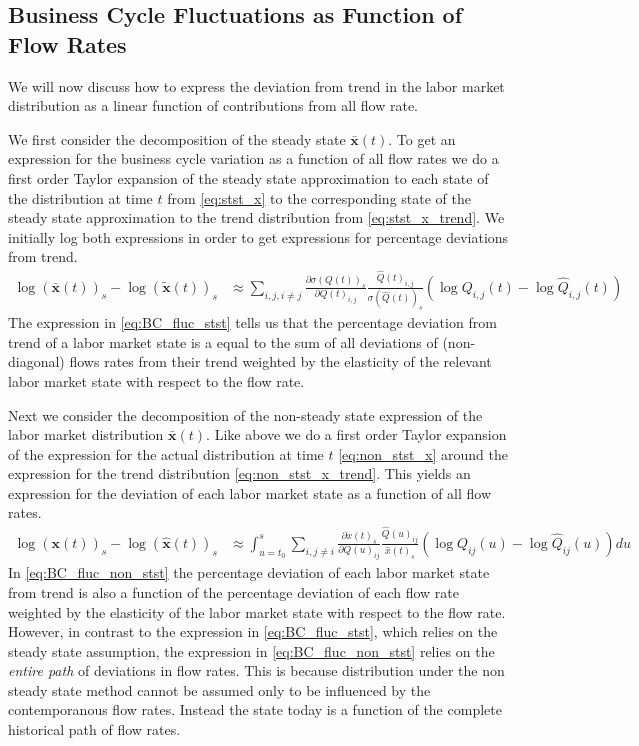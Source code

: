 \subsection{Business Cycle Fluctuations as Function of Flow Rates}
We will now discuss how to express the deviation from trend in the labor market distribution as a linear function of contributions from all flow rate. 

We first consider the decomposition of the steady state $\mathbf{\bar{x}}(t)$. To get an expression for the business cycle variation as a function of all flow rates we do a first order Taylor expansion of the steady state approximation to each state of the distribution at time $t$ from \eqref{eq:stst_x} to the corresponding state of the steady state approximation to the trend distribution from \eqref{eq:stst_x_trend}. We initially log both expressions in order to get expressions for percentage deviations from trend.
\begin{align}
		\log \left( \mathbf{\bar{x}}(t) \right)_s -\log \left(\mathbf{ \tilde{x}}(t) \right)_s &\approx 
		\sum_{i,j, i\neq j} \frac{\partial \sigma(Q(t))_s}{\partial Q(t)_{i,j}} \frac{\hat{Q}(t)_{i,j}}{\sigma(\hat Q(t))_s} 
		 \left( \log Q_{i,j} (t)-\log \hat{Q}_{i,j} (t) \right) \label{eq:BC_fluc_stst}
\end{align}
The expression in \eqref{eq:BC_fluc_stst} tells us that the percentage deviation from trend of a labor market state is a equal to the sum of all deviations of (non-diagonal) flows rates from their trend weighted by the elasticity of the relevant labor market state with respect to the flow rate.

Next we consider the decomposition of the non-steady state expression of the labor market distribution $\mathbf{\bar{x}}(t)$. Like above we do a first order Taylor expansion of the expression for the actual distribution at time $t$ \eqref{eq:non_stst_x} around the expression for the trend distribution \eqref{eq:non_stst_x_trend}. This yields an expression for the deviation of each labor market state as a function of all flow rates.
\begin{align}
	\log \left( \mathbf{x}(t) \right)_s  -\log \left( \mathbf{\hat{x}}(t) \right)_s &\approx  
	\int_{u=t_0}^{s}\sum_{i,j\neq i} \frac{\partial  x(t)_s}{\partial Q(u)_{ij}} \frac{\hat{Q}(u)_{ij}}{ \hat{x}(t)_s}\left( \log Q_{ij}(u) - \log \hat{Q}_{ij}(u) \right) du \label{eq:BC_fluc_non_stst}
\end{align}
In \eqref{eq:BC_fluc_non_stst} the percentage deviation of each labor market state from trend is also a function of the percentage deviation of each flow rate weighted by the elasticity of the labor market state with respect to the flow rate. However, in contrast to the expression in \eqref{eq:BC_fluc_stst}, which relies on the steady state assumption, the expression in \eqref{eq:BC_fluc_non_stst} relies on the \emph{entire path} of deviations in flow rates. This is because distribution under the non steady state method cannot be assumed only to be influenced by the contemporanous flow rates. Instead the state today is a function of the complete historical path of flow rates.

